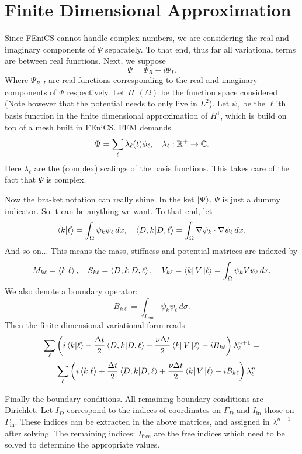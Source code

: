 \documentclass[../../main.tex]{subfiles}
\begin{document}
\section{Finite Dimensional Approximation}

Since FEniCS cannot handle complex numbers, we are considering the 
real and imaginary components of $\Psi$ separately. 
To that end, thus far all variational terms are between real functions.
Next, we suppose
\[
  \Psi = \Psi_R + i \Psi_I
.\] 
Where $\Psi_{R, I}$ are real functions corresponding to the 
real and imaginary components of $\Psi$ respectively.  
Let $H^1(\Omega)$ be the function space considered
(Note however that the potential needs to only live in $L^2$).
Let $\psi_\ell$ be the $\ell$'th basis function in the 
finite dimensional approximation of $H^1$, which is build on top of 
a mesh built in FEniCS.  
FEM demands
\[
		\Psi = \sum_\ell \lambda_\ell(t) \phi_\ell, \quad 
		\lambda_\ell : \mathbb{R}^+ \to \mathbb{C}
.\] 
Here $\lambda_\ell$ are the (complex) scalings of the basis functions.
This takes care of the fact that $\Psi$ is complex. 

Now the bra-ket notation can really shine.  In the ket $\ket{\Psi}$, 
$\Psi$ is just a dummy indicator.  So it can be anything we want.
To that end, let
\[
		\bra{k} \ket{\ell} = \int_\Omega \psi_k \psi_\ell \, dx, \quad
		\bra{D, k} \ket{D, \ell} = 
		\int_\Omega \nabla \psi_k \cdot \nabla \psi_\ell \, dx
.\] 
And so on... This means the mass, stiffness and potential 
matrices are indexed by
\[
		M_{k\ell} = \bra{k} \ket{\ell}, \quad 
		S_{k\ell} = \bra{D, k} \ket{D, \ell}, \quad 
		V_{k\ell} = \bra{k} V \ket{\ell} = 
		\int_\Omega \psi_k V \psi_\ell \, dx
.\] 
We also denote a boundary operator:
\[
		B_{k \ell} = \int_{\Gamma_\mathrm{out}} \psi_k \psi_\ell \, d\sigma
.\] 
Then the finite dimensional variational form reads
\begin{equation}
		\begin{split}
		\label{eq:fd-variational}
		\sum_\ell &\left(i \bra{k}\ket{\ell} - 
				\frac{\Delta t}{2} \bra{D, k}\ket{D, \ell} - 
				\frac{\nu \Delta t}{2} \bra{k} V \ket{\ell} - 
				i B_{k \ell} 
		\right) \lambda_\ell^{n+1} = \\
		& \sum_\ell \left(i \bra{k}\ket{\ell} + 
				\frac{\Delta t}{2} \bra{D, k} \ket{D, \ell} + 
				\frac{\nu \Delta t}{2} \bra{k} V \ket{\ell} - 
				i B_{k \ell}
		\right) \lambda_\ell^n
		\end{split}
\end{equation} 
 
Finally the boundary conditions.
All remaining boundary conditions are Dirichlet.  
Let $I_D$ correspond to the indices of coordinates on $\Gamma_D$ 
and $I_\mathrm{in}$ those on $\Gamma_\mathrm{in}$.  
These indices can be extracted in the above matrices,
and assigned in $\lambda^{n+1}$ after solving.
The remaining indices:
$I_\mathrm{free}$ are the free indices which need to be solved to 
determine the appropriate values.
\end{document}
